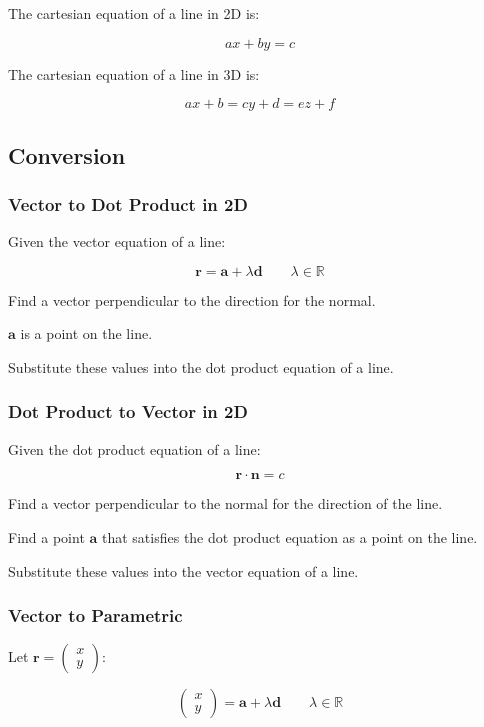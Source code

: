 \documentclass[a4paper,11pt]{article}
\newcommand{\bb}{\boldsymbol}
\begin{document}
The cartesian equation of a line in 2D is:

$$
ax + by = c
$$

The cartesian equation of a line in 3D is:

$$
ax + b = cy + d = ez + f
$$


\subsection{Conversion}

\subsubsection{Vector to Dot Product in 2D}

Given the vector equation of a line:

$$
\bb{r} = \bb{a} + \lambda \bb{d} \qquad \lambda \in \mathbb{R}
$$

Find a vector perpendicular to the direction for the normal.

$\bb{a}$ is a point on the line.

Substitute these values into the dot product equation of a line.


\subsubsection{Dot Product to Vector in 2D}

Given the dot product equation of a line:

$$
\bb{r} \cdot \bb{n} = c
$$

Find a vector perpendicular to the normal for the direction of the line.

Find a point $\bb{a}$ that satisfies the dot product equation as a point on the
line.

Substitute these values into the vector equation of a line.


\subsubsection{Vector to Parametric}

Let $\bb{r} = \begin{pmatrix} x \\ y \end{pmatrix}$:

$$
\begin{pmatrix} x \\ y \end{pmatrix} = \bb{a} + \lambda \bb{d} \qquad \lambda \in \mathbb{R}
$$
\end{document}
